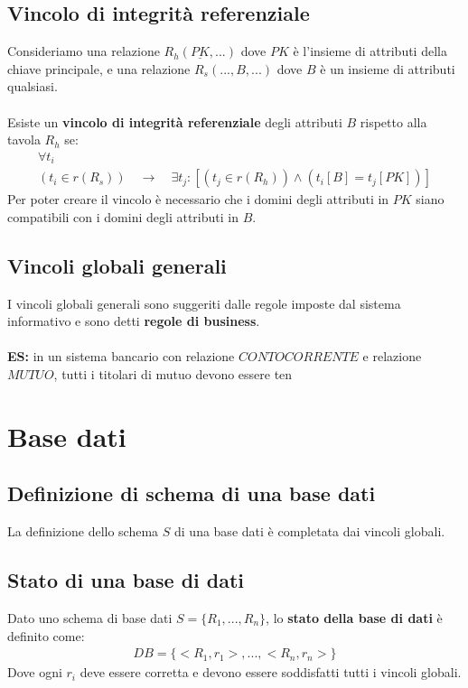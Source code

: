 \subsection{Vincolo di integrità referenziale}
Consideriamo una relazione $R_h(\underline{PK}, ...)$ dove $PK$ è l'insieme di attributi della chiave principale, e una relazione $R_s(..., B, ...)$ dove $B$ è un insieme di attributi qualsiasi.\\\\
Esiste un \textbf{vincolo di integrità referenziale} degli attributi $B$ rispetto alla tavola $R_h$ se:
    \begin{equation}\begin{aligned}
        \forall t_i \\
        (t_i \in r (R_s))
        \quad \rightarrow \quad
        \exists t_j: [(t_j \in r(R_h)) \wedge (t_i[B] = t_j[PK])]
    \end{aligned}\end{equation}
Per poter creare il vincolo è necessario che i domini degli attributi in $PK$ siano compatibili con i domini degli attributi in $B$.    

\subsection{Vincoli globali generali}
I vincoli globali generali sono suggeriti dalle regole imposte dal sistema informativo e sono detti \textbf{regole di business}.\\\\
\textbf{ES:} in un sistema bancario con relazione $CONTOCORRENTE$ e relazione $MUTUO$, tutti i titolari di mutuo devono essere ten

\section{Base dati}
\subsection{Definizione di schema di una base dati}
La definizione dello schema $S$ di una base dati è completata dai vincoli globali.
\subsection{Stato di una base di dati}
Dato uno schema di base dati $S = \{    R_1, ..., R_n   \}$, lo \textbf{stato della base di dati} è definito come:
    \begin{equation}\begin{aligned}
        DB = \{ <R_1,r_1>,  ..., <R_n, r_n>   \}
    \end{aligned}\end{equation}
Dove ogni $r_i$ deve essere corretta e devono essere soddisfatti tutti i vincoli globali.

